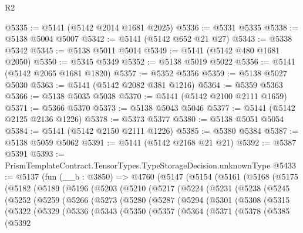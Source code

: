 \begin{lexlean}{R2}
\begin{coremodule}
@5335 := @5141 (@5142 @2014 @1681 @2025)
@5336 := @5331 @5335
@5338 := @5138 @5004 @5007
@5342 := @5141 (@5142 @652 @21 @27)
@5343 := @5338 @5342
@5345 := @5138 @5011 @5014
@5349 := @5141 (@5142 @480 @1681 @2050)
@5350 := @5345 @5349
@5352 := @5138 @5019 @5022
@5356 := @5141 (@5142 @2065 @1681 @1820)
@5357 := @5352 @5356
@5359 := @5138 @5027 @5030
@5363 := @5141 (@5142 @2082 @381 @1216)
@5364 := @5359 @5363
@5366 := @5138 @5035 @5038
@5370 := @5141 (@5142 @2100 @2111 @1659)
@5371 := @5366 @5370
@5373 := @5138 @5043 @5046
@5377 := @5141 (@5142 @2125 @2136 @1226)
@5378 := @5373 @5377
@5380 := @5138 @5051 @5054
@5384 := @5141 (@5142 @2150 @2111 @1226)
@5385 := @5380 @5384
@5387 := @5138 @5059 @5062
@5391 := @5141 (@5142 @2168 @21 @21)
@5392 := @5387 @5391
@5393 := PrismTemplateContract.TensorTypes.TypeStorageDecision.unknownType
@5433 := @5137
    (fun (__b : @3850) =>
    @4760
      (@5147
        (@5154
          (@5161
            (@5168
              (@5175
                (@5182
                  (@5189
                    (@5196
                      (@5203
                        (@5210
                          (@5217
                            (@5224
                              (@5231
                                (@5238
                                  (@5245
                                    (@5252
                                      (@5259
                                        (@5266
                                          (@5273
                                            (@5280
                                              (@5287
                                                (@5294
                                                  (@5301
                                                    (@5308
                                                      (@5315
                                                        (@5322
                                                          (@5329
                                                            (@5336
                                                              (@5343
                                                                (@5350
                                                                  (@5357
                                                                    (@5364
                                                                      (@5371
                                                                        (@5378
                                                                          (@5385
                                                                            (@5392

\end{coremodule}
\end{lexlean}
